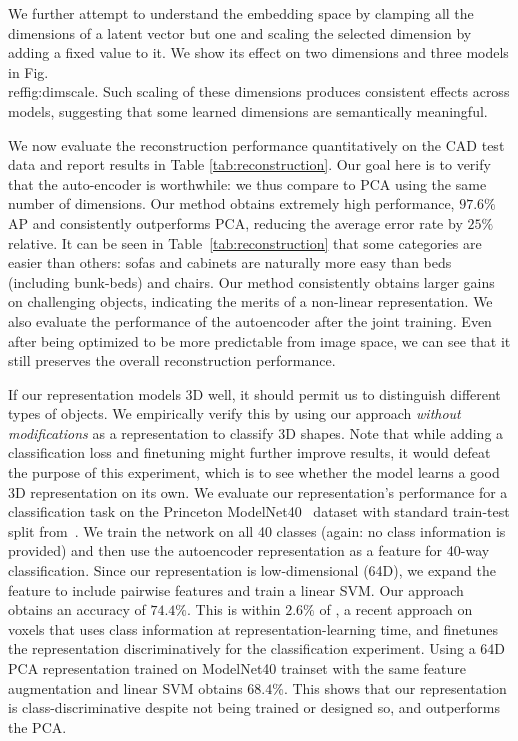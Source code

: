 \documentclass[runningheads]{llncs}
\begin{document}
We further attempt to understand the embedding space by
clamping all the dimensions of a latent vector but one and scaling the 
selected dimension by adding a fixed value to it.
We show its effect on two dimensions and three models
in Fig.\\ref{fig:dimscale}. Such scaling of these
dimensions produces consistent
effects across models, suggesting that some learned dimensions are 
semantically meaningful.

 We now evaluate the
reconstruction performance quantitatively on the CAD test data and report
results in Table \ref{tab:reconstruction}. Our goal here is to verify that the
auto-encoder is worthwhile: we thus compare to PCA using the same
number of dimensions. 
Our method obtains extremely high performance, $97.6\%$ AP and consistently outperforms PCA, reducing the average error rate by $25\%$ relative. It can be seen
in Table~\ref{tab:reconstruction} that some categories are easier than others:
sofas and cabinets are naturally more easy than beds (including bunk-beds) and chairs.
Our method consistently obtains larger gains on challenging objects, indicating the 
merits of a
non-linear representation. We also evaluate the performance of 
the autoencoder after the joint training. Even after being optimized to be more predictable
from image space, we can see that it still 
preserves the overall reconstruction performance.

 If our representation models 3D well,
it should permit us to distinguish different types 
of objects. We empirically verify this by using our approach
{\it without modifications} as a representation to classify 3D shapes.
Note that while adding a classification loss and finetuning might 
further improve results, it would defeat the purpose of this
experiment, which is to see whether the model learns a good 3D representation on
its own. 
We evaluate our representation's performance for a classification task on the Princeton ModelNet40~\cite{modelnet_dataset} dataset
with standard train-test split from~\cite{3dshapenet}. %
We train the network on all 40 classes (again: no class information is provided)
and then use the autoencoder representation as a feature for
40-way classification. Since our representation is low-dimensional (64D), we
expand the feature to include pairwise features and train a linear SVM. Our approach obtains an
accuracy of $74.4\%$. This is within $2.6\%$ of
\cite{3dshapenet}, a recent approach on voxels that uses
class information at representation-learning time, and finetunes the representation
discriminatively for the classification experiment. Using a 64D PCA representation
trained on ModelNet40 trainset with the same feature augmentation and linear SVM obtains $68.4\%$.
This shows that our representation is class-discriminative
despite not being trained or designed so, and outperforms the
PCA.
\end{document}
